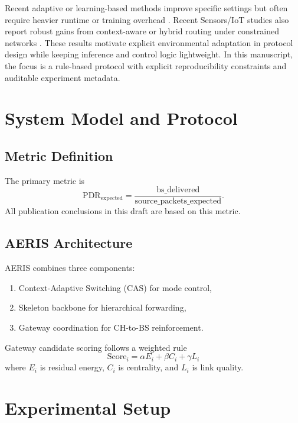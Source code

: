 \documentclass[sensors,article,submit,moreauthors,pdftex]{Definitions/mdpi}
\begin{document}
Recent adaptive or learning-based methods improve specific settings but often require heavier runtime or training overhead \cite{Ren2024,Okine2024,Chen2023Survey}. Recent Sensors/IoT studies also report robust gains from context-aware or hybrid routing under constrained networks \cite{ElFouly2023ILP,Dan2024EMRAR,Bhukya2025Hybrid}. These results motivate explicit environmental adaptation in protocol design while keeping inference and control logic lightweight. In this manuscript, the focus is a rule-based protocol with explicit reproducibility constraints and auditable experiment metadata.

\section{System Model and Protocol}
\subsection{Metric Definition}
The primary metric is
\begin{equation}
\mathrm{PDR}_{\mathrm{expected}} = \frac{\mathrm{bs\_delivered}}{\mathrm{source\_packets\_expected}}.
\end{equation}
All publication conclusions in this draft are based on this metric.

\subsection{AERIS Architecture}
AERIS combines three components:
\begin{enumerate}
\item Context-Adaptive Switching (CAS) for mode control,
\item Skeleton backbone for hierarchical forwarding,
\item Gateway coordination for CH-to-BS reinforcement.
\end{enumerate}
Gateway candidate scoring follows a weighted rule
\begin{equation}
\mathrm{Score}_i = \alpha E_i + \beta C_i + \gamma L_i
\end{equation}
where $E_i$ is residual energy, $C_i$ is centrality, and $L_i$ is link quality.

\section{Experimental Setup}
\end{document}
